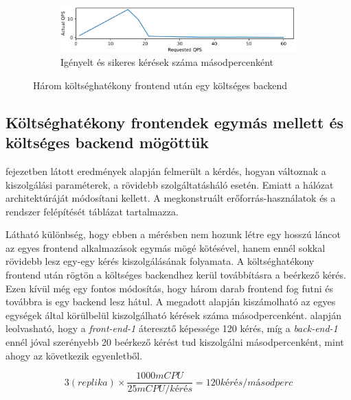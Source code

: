 \begin{figure}
\hfill
\begin{subfigure}{\textwidth}
    \includegraphics[width=\textwidth]{figures/3FE-1BE-chain/actual-qps.png}
    \caption{Igényelt és sikeres kérések száma másodpercenként}
    \label{subfig:actual-qps}
\end{subfigure}
        
\caption{Három költséghatékony frontend után egy költséges backend}
\label{fig:3FE_1BE_chain}
\end{figure}

\subsection{Költséghatékony frontendek egymás mellett és költséges backend mögöttük}
\label{subsec:3FE_1BE_stack}
 fejezetben látott eredmények alapján felmerült a kérdés, hogyan változnak a kiszolgálási paraméterek, a rövidebb szolgáltatásháló esetén. 
Emiatt a hálózat architektúráját módosítani kellett.
A megkonstruált erőforrás-használatok és a rendszer felépítését  táblázat tartalmazza. 

Látható különbség, hogy ebben a mérésben nem hozunk létre egy hosszú láncot az egyes frontend alkalmazások egymás mögé kötésével, hanem ennél sokkal rövidebb lesz egy-egy kérés kiszolgálásának folyamata. 
A költséghatékony frontend után rögtön a költséges backendhez kerül továbbításra a beérkező kérés.
Ezen kívül még egy fontos módosítás, hogy három darab frontend fog futni és továbbra is egy backend lesz hátul.
A megadott alapján kiszámolható az egyes egységek által körülbelül kiszolgálható kérések száma másodpercenként.
 alapján leolvasható, hogy a \textit{front-end-1} áteresztő képessége 120 kérés, míg a \textit{back-end-1} ennél jóval szerényebb 20 beérkező kérést tud kiszolgálni másodpercenként, mint ahogy az következik  egyenletből.

\begin{equation}
\label{eq:3FEsumqps}
3(replika)\times\frac{1000 mCPU}{25 mCPU/kérés} = 120 kérés/másodperc
\end{equation}

